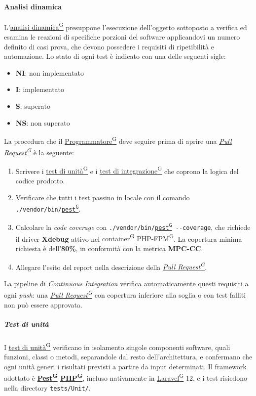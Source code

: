 \documentclass[a4paper,12pt]{article}
\providecommand{\glslink}[2]{\href{https://alittlebyte-19.github.io/Documentazione/glossario.html\#gls-#1}{\underline{#2}\textsuperscript{\scriptsize G}}}
\begin{document}
\paragraph{Analisi dinamica}
L'\glslink{analisi-dinamica}{analisi dinamica} presuppone l'esecuzione dell'oggetto sottoposto a verifica ed esamina le reazioni di specifiche porzioni del software applicandovi un numero definito di casi prova, che devono possedere i requisiti di ripetibilità e automazione. Lo stato di ogni test è indicato con una delle seguenti sigle:

\begin{itemize}
    \item \textbf{NI}: non implementato
    \item \textbf{I}: implementato
    \item \textbf{S}: superato
    \item \textbf{NS}: non superato
\end{itemize}

La procedura che il \glslink{programmatore}{Programmatore} deve seguire prima di aprire una \textit{\glslink{pull-request}{Pull Request}} è la seguente:

\begin{enumerate}
    \item Scrivere i \glslink{test-di-unita}{test di unità} e i \glslink{test-di-integrazione}{test di integrazione} che coprono la logica del codice prodotto.
    \item Verificare che tutti i test passino in locale con il comando \texttt{./vendor/bin/\glslink{pest}{pest}}.
    \item Calcolare la \textit{code coverage} con \texttt{./vendor/bin/\glslink{pest}{pest} -{}-coverage}, che richiede il driver \textbf{Xdebug} attivo nel \glslink{container}{container} \glslink{php-fpm}{PHP-FPM}. La copertura minima richiesta è dell'\textbf{80\%}, in conformità con la metrica \textbf{MPC-CC}.
    \item Allegare l'esito del report nella descrizione della \textit{\glslink{pull-request}{Pull Request}}.
\end{enumerate}

La pipeline di \textit{Continuous Integration} verifica automaticamente questi requisiti a ogni \textit{push}: una \textit{\glslink{pull-request}{Pull Request}} con copertura inferiore alla soglia o con test falliti non può essere approvata.

\subparagraph{Test di unità}
I \glslink{test-di-unita}{test di unità} verificano in isolamento singole componenti software, quali funzioni, classi o metodi, separandole dal resto dell'architettura, e confermano che ogni unità generi i risultati previsti a partire da input determinati. Il framework adottato è \textbf{\glslink{pest}{Pest} \glslink{php}{PHP}}, incluso nativamente in \glslink{laravel}{Laravel} 12, e i test risiedono nella directory \texttt{tests/Unit/}.
\end{document}
